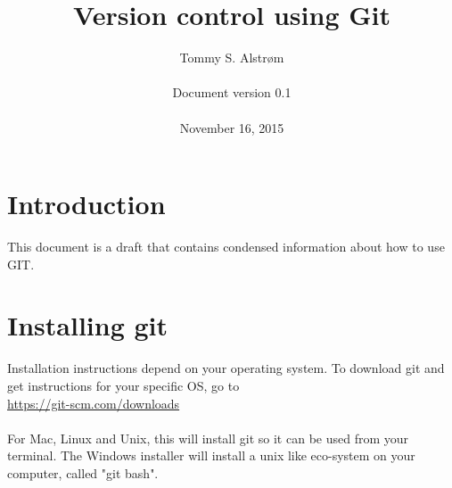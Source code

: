 \documentclass[10pt,a4paper]{article}
\title{Version control using Git}
\author{Tommy S. Alstrøm \\\\
Document version 0.1\\\\
November 16, 2015}
\date{\vspace{-5ex}}
\begin{document}
\maketitle
\section{Introduction}
This document is a draft that contains condensed information about how to use GIT.


\section{Installing git}
Installation instructions depend on your operating system. To download git and get instructions for your specific OS, go to\\
\url{https://git-scm.com/downloads}\\\\
For Mac, Linux and Unix, this will install git so it can be used from your terminal. The Windows installer will install a unix like eco-system on your computer, called "git bash". 
\end{document}
